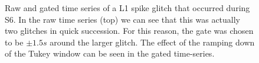 \begin{figure}[p]
\center
{}
\caption{Raw and gated time series of a L1 spike glitch that occurred during
S6. In the raw time series (top) we can see that this was actually two
glitches in quick succession. For this reason, the gate was chosen to be
$\pm1.5s$ around the larger glitch. The effect of the ramping down of the Tukey
window can be seen in the gated time-series.}
\label{fig:gating-time_series}
\end{figure}


